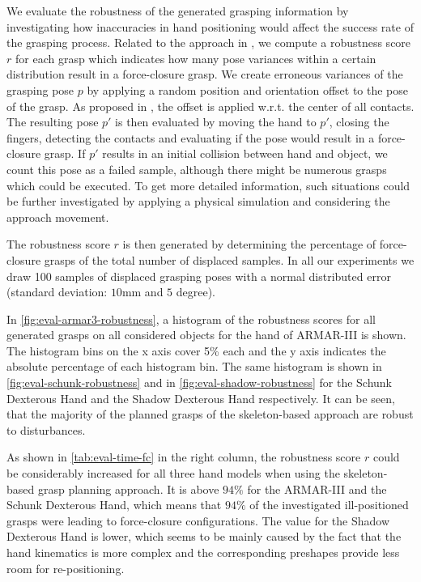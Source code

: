 We evaluate the robustness of the generated grasping information by investigating how inaccuracies in hand positioning would affect the success rate of the grasping process. 
Related to the approach in \cite{weisz2012pose}, we compute a robustness score $r$ for each grasp which indicates how many pose variances within a certain distribution result in a force-closure grasp. 
We create erroneous variances of the grasping pose $p$ by applying a random position and orientation offset to the pose of the grasp. As proposed in \cite{weisz2012pose}, the offset is applied w.r.t. the center of all contacts. The resulting pose $p'$ is then evaluated by moving the hand to $p'$, closing the fingers, detecting the contacts and evaluating if the pose would result in a force-closure grasp. If $p'$ results in an initial collision between hand and object, we count this pose as a failed sample, although there might be numerous grasps which could be executed. To get more detailed information, such situations could be further investigated by applying a physical simulation and considering the approach movement.


The robustness score $r$ is then generated by determining the percentage of force-closure grasps of the total number of displaced samples. In all our experiments we draw 100 samples of displaced grasping poses with a normal distributed error (standard deviation: $10$mm and $5$ degree).

In \autoref{fig:eval-armar3-robustness}, a histogram of the robustness scores for all generated grasps on all considered objects for the hand of ARMAR-III is shown. The histogram bins on the x axis cover 5\% each and the y axis indicates the absolute percentage of each histogram bin. 
The same histogram is shown in \autoref{fig:eval-schunk-robustness} and in \autoref{fig:eval-shadow-robustness} for the Schunk Dexterous Hand and the Shadow Dexterous Hand respectively.
It can be seen, that the majority of the planned grasps of the skeleton-based approach are robust to disturbances. 

As shown in \autoref{tab:eval-time-fc} in the right column, the robustness score $r$ could be considerably increased for all three hand models when using the skeleton-based grasp planning approach.
It is above $94\%$ for the ARMAR-III and the Schunk Dexterous Hand, which means that $94\%$ of the investigated ill-positioned grasps were leading to force-closure configurations. 
The value for the Shadow Dexterous Hand is lower, which seems to be mainly caused by the fact that the hand kinematics is more complex and the corresponding preshapes provide less room for re-positioning.

